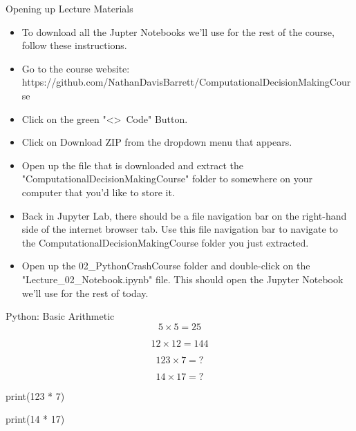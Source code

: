 \documentclass[10pt, aspectratio=169]{beamer}
\begin{document}
\begin{frame}{Opening up Lecture Materials}
    \begin{itemize}
        \item To download all the Jupter Notebooks we'll use for the rest of the course, follow these instructions.
        \item Go to the course website: https://github.com/NathanDavisBarrett/ComputationalDecisionMakingCourse
        \item Click on the green "\textless\textgreater\ Code" Button.
        \item Click on Download ZIP from the dropdown menu that appears.
        \item Open up the file that is downloaded and extract the "ComputationalDecisionMakingCourse" folder to somewhere on your computer that you'd like to store it.
        \item Back in Jupyter Lab, there should be a file navigation bar on the right-hand side of the internet browser tab. Use this file navigation bar to navigate to the ComputationalDecisionMakingCourse folder you just extracted.
        \item Open up the 02\_PythonCrashCourse folder and double-click on the "Lecture\_02\_Notebook.ipynb" file. This should open the Jupyter Notebook we'll use for the rest of today.
    \end{itemize}
\end{frame}

\begin{frame}{Python: Basic Arithmetic}
    $$5 \times 5 = 25$$

    $$12 \times 12 = 144$$

    $$123 \times 7 = ?$$

    $$14 \times 17 = ?$$

    \vspace{1cm}
    \begin{center}
        print(123 * 7)

        print(14 * 17)   
    \end{center}
\end{frame}
\end{document}
